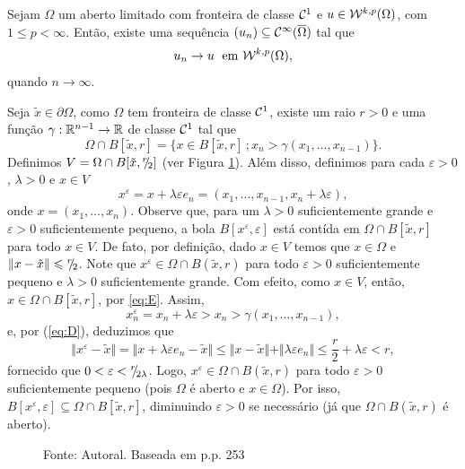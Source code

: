 \begin{tbox} \label{thm:aprox3}
    Sejam $\Omega$ um aberto limitado com fronteira de classe $\mathcal{C}^1$ e $u \in \mathcal{W}^{k,p}(\Omega)$, com $1 \leqslant p < \infty$.
    Então, existe uma sequência $(u_n) \subseteq \mathcal{C}^\infty(\overline\Omega)$ tal que
    \[
        u_n \to u \;\text{ em } \mathcal{W}^{k,p}(\Omega),
    \]
    quando $n \to \infty$.
\end{tbox}
\begin{prf}
    Seja $\tilde x \in \partial \Omega$, como $\Omega$ tem fronteira de classe $\mathcal{C}^1$, existe um raio $r > 0$ e uma função $\gamma : \mathbb{R}^{n-1} \to \mathbb{R}$ de classe $\mathcal{C}^1$ tal que
    \begin{equation} \label{eq:E}
        \Omega \cap B[\tilde x, r] = \{x \in B[\tilde x, r] \,; x_n > \gamma(x_1,\dots,x_{n-1})\}.
    \end{equation}
    Definimos $V = \Omega \cap B[\tilde x, {}^{r}\!\!/\!_{2}]$ (ver Figura \ref{fig:conjunto-demonstracao-aprox-3}).
    Além disso, definimos para cada $\varepsilon > 0$, $\lambda > 0$ e $x \in V$
    \begin{equation} \label{eq:D}
        x^\varepsilon = x + \lambda \varepsilon e_n = (x_1,\dots,x_{n-1}, x_n + \lambda\varepsilon),
    \end{equation}
    onde $x = (x_1,\dots,x_n)$.
    Observe que, para um $\lambda > 0$ suficientemente grande e $\varepsilon > 0$ suficientemente pequeno, a bola $B[x^\varepsilon\!,\varepsilon]$ está contída em $\Omega \cap B[\tilde x,r]$ para todo $x \in V$.
    De fato, por definição, dado $x \in V$ temos que $x \in \Omega$ e $\Vert x - \tilde x \Vert \leqslant {}^{r}\!\!/\!_{2}$.
    Note que $x^\varepsilon \in \Omega \cap B(\tilde x, r)$ para todo $\varepsilon > 0$ suficientemente pequeno e $\lambda > 0$ suficientemente grande.
    Com efeito, como $x \in V$, então, $x \in \Omega \cap B[\tilde x, r]$, por \ref{eq:E}. Assim,
    \[
        x^\varepsilon_n = x_n + \lambda \varepsilon > x_n >  \gamma(x_{1},\dots,x_{n-1}),
    \]
    e, por (\ref{eq:D}), deduzimos que
    \[
        \Vert x^\varepsilon - \tilde x \Vert = \Vert x + \lambda \varepsilon e_n - \tilde x \Vert \leqslant \Vert x - \tilde x \Vert + \Vert \lambda \varepsilon e_n  \Vert \leqslant \frac{r}{2} + \lambda\varepsilon < r,
    \]
    fornecido que $0 <\varepsilon < {}^{r}\!\!/\!_{2\lambda}$.
    Logo, $x^\varepsilon \in \Omega \cap B(\tilde x, r)$ para todo $\varepsilon > 0$ suficientemente pequeno (pois $\Omega$ é aberto e $x \in \Omega$).
    Por isso,
    $B[x^\varepsilon\!, \varepsilon] \subseteq \Omega \cap B[\tilde x,r]$, diminuindo $\varepsilon > 0$ se necessário (já que $\Omega \cap B(\tilde x, r)$ é aberto).
    \begin{figure}
        \centering
        
        \caption{Fonte: Autoral. Baseada em \cite{evans-pde} p.p. 253}
        \label{fig:conjunto-demonstracao-aprox-3}
    \end{figure}


\end{prf}
